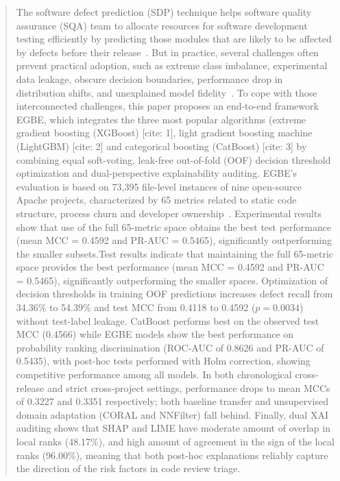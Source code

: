 \documentclass[conference]{IEEEtran}
\begin{document}
\begin{abstract}
The software defect prediction (SDP) technique helps software quality assurance (SQA) team to allocate resources for software development testing efficiently by predicting those modules that are likely to be affected by defects before their release~\cite{yatish2019affected, ali2024ensemble}.
But in practice, several challenges often prevent practical adoption, such as extreme class imbalance, experimental data leakage, obscure decision boundaries, performance drop in distribution shifts, and unexplained model fidelity~\cite{sottomayor2024survey, tantithamthavorn2019optimization}.
To cope with those interconnected challenges, this paper proposes an end-to-end framework EGBE, which integrates the three most popular algorithms (extreme gradient boosting (XGBoost) [cite: 1], light gradient boosting machine (LightGBM) [cite: 2] and categorical boosting (CatBoost) [cite: 3] by combining equal soft-voting, leak-free out-of-fold (OOF) decision threshold optimization and dual-perspective explainability auditing.
EGBE's evaluation is based on 73,395 file-level instances of nine open-source Apache projects, characterized by 65 metrics related to static code structure, process churn and developer ownership~\cite{yatish2019affected}.
Experimental results show that use of the full 65-metric space obtains the best test performance (mean MCC = 0.4592 and PR-AUC = 0.5465), significantly outperforming the smaller subsets.Test results indicate that maintaining the full 65-metric space provides the best performance (mean MCC = 0.4592 and PR-AUC = 0.5465), significantly outperforming the smaller spaces.
Optimization of decision thresholds in training OOF predictions increases defect recall from 34.36\% to 54.39\% and test MCC from 0.4118 to 0.4592 ($p = 0.0034$) without test-label leakage.
CatBoost performs best on the observed test MCC (0.4566) while EGBE models show the best performance on probability ranking discrimination (ROC-AUC of 0.8626 and PR-AUC of 0.5435), with post-hoc tests performed with Holm correction, showing competitive performance among all models.
In both chronological cross-release and strict cross-project settings, performance drops to mean MCCs of 0.3227 and 0.3351 respectively; both baseline transfer and unsupervised domain adaptation (CORAL and NNFilter) fall behind.
Finally, dual XAI auditing shows that SHAP and LIME have moderate amount of overlap in local ranks (48.17\%), and high amount of agreement in the sign of the local ranks (96.00\%), meaning that both post-hoc explanations reliably capture the direction of the risk factors in code review triage.
\end{abstract}
\end{document}
